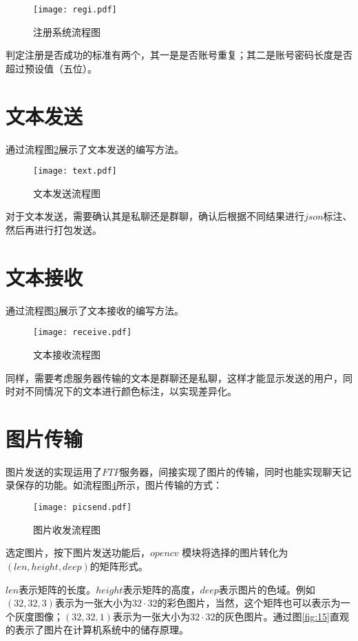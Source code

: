 \documentclass[forprint]{OSPaper}
\begin{document}
\begin{figure}[!htbp]
	\centering
	\texttt{[image: regi.pdf]}
	\caption{注册系统流程图}
	\label{fig:7}
\end{figure}

判定注册是否成功的标准有两个，其一是是否账号重复；其二是账号密码长度是否超过预设值（五位）。

\section{文本发送}

通过流程图\ref{fig:8}展示了文本发送的编写方法。

\begin{figure}[!htbp]
	\centering
	\texttt{[image: text.pdf]}
	\caption{文本发送流程图}
	\label{fig:8}
\end{figure}

对于文本发送，需要确认其是私聊还是群聊，确认后根据不同结果进行$ json $标注、然后再进行打包发送。

\section{文本接收}

通过流程图\ref{fig:9}展示了文本接收的编写方法。

\begin{figure}[!htbp]
	\centering
	\texttt{[image: receive.pdf]}
	\caption{文本接收流程图}
	\label{fig:9}
\end{figure}

同样，需要考虑服务器传输的文本是群聊还是私聊，这样才能显示发送的用户，同时对不同情况下的文本进行颜色标注，以实现差异化。

\section{图片传输}
图片发送的实现运用了$FTP$服务器，间接实现了图片的传输，同时也能实现聊天记录保存的功能。如流程图\ref{fig:11}所示，图片传输的方式：

\begin{figure}[!htbp]
	\centering
	\texttt{[image: picsend.pdf]}
	\caption{图片收发流程图}
	\label{fig:11}
\end{figure}

选定图片，按下图片发送功能后，$opencv$ 模块将选择的图片转化为$(len,height,deep)$的矩阵形式。

$len$表示矩阵的长度。$height$表示矩阵的高度，$deep$表示图片的色域。例如$(32,32,3)$表示为一张大小为$32 \cdot 32$的彩色图片，当然，这个矩阵也可以表示为一个灰度图像；$(32,32,1)$表示为一张大小为$32 \cdot 32$的灰色图片。通过图\ref{fig:15}直观的表示了图片在计算机系统中的储存原理。
\end{document}
